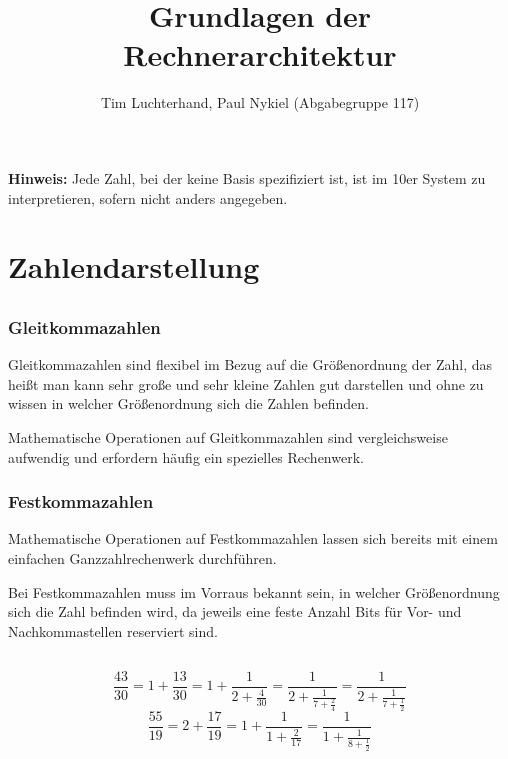 \documentclass[DIN, pagenumber=false, fontsize=11pt, parskip=half]{scrartcl}
\title{Grundlagen der Rechnerarchitektur}
\author{Tim Luchterhand, Paul Nykiel (Abgabegruppe 117)}
\begin{document}
    \maketitle
    \textbf{Hinweis: } Jede Zahl, bei der keine Basis spezifiziert ist, ist im 10er System zu interpretieren, sofern nicht anders angegeben.
    \section{Zahlendarstellung}
    \subsection{}
    \subsubsection{Gleitkommazahlen}
    Gleitkommazahlen sind flexibel im Bezug auf die Größenordnung der Zahl, das heißt man kann sehr große und sehr kleine Zahlen gut darstellen und 
    ohne zu wissen in welcher Größenordnung sich die Zahlen befinden.

    Mathematische Operationen auf Gleitkommazahlen sind vergleichsweise aufwendig und erfordern häufig ein spezielles Rechenwerk.
    \subsubsection{Festkommazahlen}
    Mathematische Operationen auf Festkommazahlen lassen sich bereits mit einem einfachen Ganzzahlrechenwerk durchführen.

    Bei Festkommazahlen muss im Vorraus bekannt sein, in welcher Größenordnung sich die Zahl befinden wird, da jeweils eine feste Anzahl Bits für 
    Vor- und Nachkommastellen reserviert sind.

    \subsection{}
    \begin{equation*}
        \frac{43}{30} = 1 + \frac{13}{30} = 1 + \frac{1}{2+\frac{4}{30}} = \frac{1}{2+\frac{1}{7+\frac{2}{4}}} = \frac{1}{2+\frac{1}{7+\frac{1}{2}}}    
    \end{equation*}
    \begin{equation*}
        \frac{55}{19} = 2 + \frac{17}{19} = 1 + \frac{1}{1 + \frac{2}{17}} = \frac{1}{1 +  \frac{1}{8 + \frac{1}{2}}}
    \end{equation*}
\end{document}
